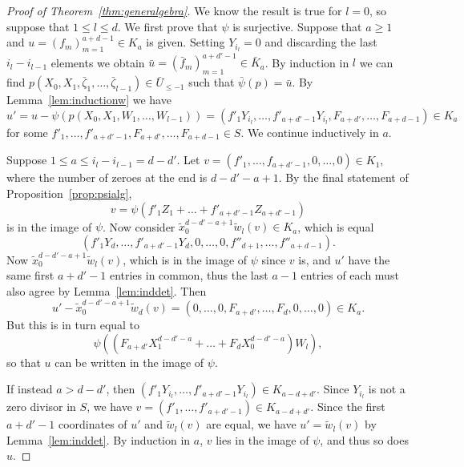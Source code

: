 \documentclass[a4paper,11pt]{amsart}
\theoremstyle{plain}
\theoremstyle{definition}
\begin{document}
\begin{proof}[Proof of Theorem~\ref{thm:generalgebra}]
    We know the result is true for $l = 0$, so suppose that $1 \leq l \leq d$. We first prove that $\psi$ is surjective. Suppose that $a \geq 1$ and $u = (f_m)_{m=1}^{a+d-1}\in K_a$ is given. Setting $Y_{i_l} = 0$ and discarding the last $i_l - i_{l-1}$ elements we obtain $\bar u = (\bar f_m)_{m=1}^{a+d'-1} \in \bar K_a$. By induction in $l$ we can find $p(X_0,X_1,\bar \zeta_1,\dots,\bar \zeta_{l-1}) \in \bar U_{\leq -1}$ such that $\bar \psi(p) = \bar u$. By Lemma~\ref{lem:inductionw} we have
    \[
    u' = u - \psi \left(p(X_0,X_1,W_1,\dots,W_{l-1})\right) = (f'_1 Y_{i_l},\dots,f'_{a+d'-1} Y_{i_l},F_{a+d'},\dots,F_{a+d-1}) \in K_a
    \]
    for some $f'_1,\dots,f'_{a+d'-1},F_{a+d'},\dots,F_{a+d-1} \in S$. We continue inductively in $a$.
    
    Suppose $1 \leq a \leq i_l - i_{l-1} = d-d'$. Let $v = (f'_1,\dots,f_{a+d'-1},0,\dots,0) \in K_1$, where the number of zeroes at the end is $d-d' -a +1$. By the final statement of Proposition~\ref{prop:psialg}, 
    \[v = \psi(f'_1 Z_1 + \dots + f'_{a+d'-1}Z_{a+d'-1})
    \]
    is in the image of $\psi$. Now consider $\tilde x_0^{d-d' -a +1} \tilde w_l (v) \in K_a$, which is equal
    \[
    (f'_1 Y_d,\dots,f'_{a+d'-1}Y_d,0,\dots,0,f''_{d+1},\dots,f''_{a+d-1}).
    \]
    Now $\tilde x_0^{d-d' -a +1} \tilde w_l (v)$, which is in the image of $\psi$ since $v$ is, and $u'$ have the same first $a+d'-1$ entries in common, thus the last $a-1$ entries of each must also agree by Lemma~\ref{lem:inddet}. Then
    \[
    u' - \tilde x_0^{d-d' -a +1} \tilde w_d (v) = (0,\dots,0,F_{a+d'},\dots,F_{d},0,\dots,0) \in K_a.
    \]
    But this is in turn equal to
    \[
    \psi\left((F_{a+d'} X_1^{d-d'-a} + \dots + F_{d} X_0^{d - d' -a})W_l\right),
    \]
    so that $u$ can be written in the image of $\psi$.

    If instead $a > d - d'$, then $(f'_1 Y_{i_l},\dots,f'_{a+d'-1} Y_{i_l}) \in K_{a-d+d'}$. Since $Y_{i_l}$ is not a zero divisor in $S$, we have $v = (f'_1,\dots,f'_{a+d'-1}) \in K_{a-d+d'}$. Since the first $a+d'-1$ coordinates of $u'$ and $\tilde w_l(v)$ are equal, we have $u' = \tilde w_l (v)$ by Lemma~\ref{lem:inddet}. By induction in $a$, $v$ lies in the image of $\psi$, and thus so does $u$.


\end{proof}
\end{document}
